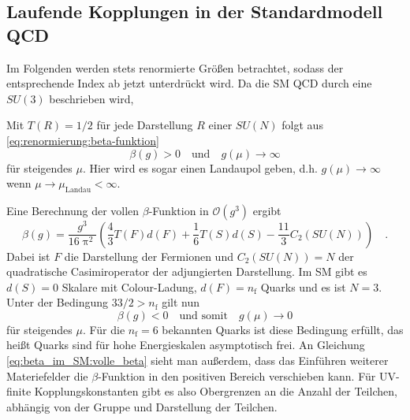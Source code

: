 \subsection{Laufende Kopplungen in der Standardmodell QCD}\label{beta_im_SM}
	Im Folgenden werden stets renormierte Größen betrachtet, sodass der 
	entsprechende Index ab jetzt unterdrückt wird. Da die SM QCD durch 
	eine $SU(3)$ beschrieben wird, 
	
	Mit $T(R)=1/2$ für jede Darstellung $R$ einer $SU(N)$ folgt aus 
   \eqref{eq:renormierung:beta-funktion} 
   \begin{equation}
	\beta(g)>0 \quad \text{und} \quad    
   g(\mu) \longrightarrow \infty
   \label{eq:beta_im_SM:landau_pol}
   \end{equation}
   für steigendes $\mu$. Hier wird es sogar einen Landaupol geben, d.h. 
   $g(\mu)\to \infty$ wenn $\mu\to \mu_\text{Landau}<\infty$.  
   
   Eine Berechnung der vollen $\beta$-Funktion in 
   $\mathcal{O}(g^3)$ ergibt 
   \cite{Luo_Wang_Xiao} 
   \begin{equation}
   \beta(g)=\frac{g^3}{16\uppi^2} \left( \frac{4}{3} T(F)d(F) +
   \frac{1}{6} T(S) d(S) - \frac{11}{3} C_2(SU(N)) \right)\quad .
   \label{eq:beta_im_SM:volle_beta}
   \end{equation}
   Dabei ist $F$ die Darstellung der Fermionen und $C_2(SU(N))=N$ der 
   quadratische Casimiroperator der adjungierten Darstellung. Im SM 
   gibt es $d(S)=0$ Skalare mit Colour-Ladung, $d(F)=n_\text{f}$ Quarks und 
   es ist $N=3$. Unter der Bedingung $33/2  >  n_\text{f}$ gilt nun 
	\begin{equation}
	\beta(g)<0 \quad \text{und somit} \quad g(\mu) \longrightarrow 0
	\end{equation}	   
	für steigendes $\mu$. Für die $n_\text{f}=6$ bekannten Quarks ist diese 
	Bedingung erfüllt, das heißt Quarks sind für hohe Energieskalen 
	asymptotisch frei. An Gleichung \eqref{eq:beta_im_SM:volle_beta} 
	sieht man außerdem, dass das Einführen weiterer Materiefelder 
	die $\beta$-Funktion in den positiven Bereich verschieben kann. Für 
	UV-finite Kopplungskonstanten gibt es also Obergrenzen an die Anzahl der 
	Teilchen, abhängig von der Gruppe und Darstellung der Teilchen.
	
   
   